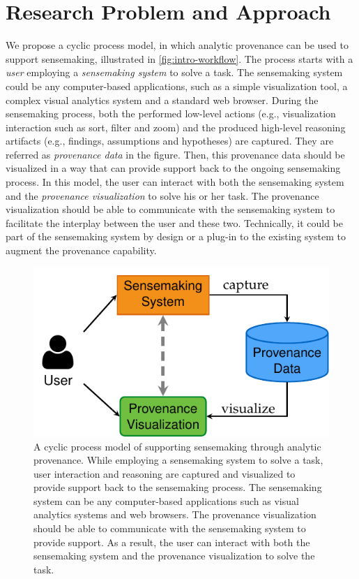 \section{Research Problem and Approach}
We propose a cyclic process model, in which analytic provenance can be used to support sensemaking, illustrated in \autoref{fig:intro-workflow}. The process starts with a \emph{user} employing a \emph{sensemaking system} to solve a task. The sensemaking system could be any computer-based applications, such as a simple visualization tool, a complex visual analytics system and a standard web browser. During the sensemaking process, both the performed low-level actions (e.g., visualization interaction such as sort, filter and zoom) and the produced high-level reasoning artifacts (e.g., findings, assumptions and hypotheses) are captured. They are referred as \emph{provenance data} in the figure. Then, this provenance data should be visualized in a way that can provide support back to the ongoing sensemaking process. In this model, the user can interact with both the sensemaking system and the \emph{provenance visualization} to solve his or her task. The provenance visualization should be able to communicate with the sensemaking system to facilitate the interplay between the user and these two. Technically, it could be part of the sensemaking system by design or a plug-in to the existing system to augment the provenance capability.

\begin{figure}[!htb]
	\centering
	\includegraphics{workflow}
	\caption{A cyclic process model of supporting sensemaking through analytic provenance. While employing a sensemaking system to solve a task, user interaction and reasoning are captured and visualized to provide support back to the sensemaking process. The sensemaking system can be any computer-based applications such as visual analytics systems and web browsers. The provenance visualization should be able to communicate with the sensemaking system to provide support. As a result, the user can interact with both the sensemaking system and the provenance visualization to solve the task.}
	\label{fig:intro-workflow}
\end{figure}


